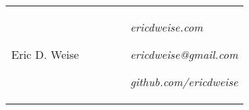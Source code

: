 \begin{tabular}{p{0.5\linewidth}p{0.5\linewidth}}
    {\Huge Eric D. Weise }
    &
    \parbox[b]{0.45\textwidth}{%
        \hfill {\sl ericdweise.com}

        \hfill {\sl ericdweise@gmail.com}

        \hfill {\sl github.com/ericdweise}
    }
\end{tabular}
\noindent\makebox[\linewidth]{\rule{\linewidth}{0.6pt}}
